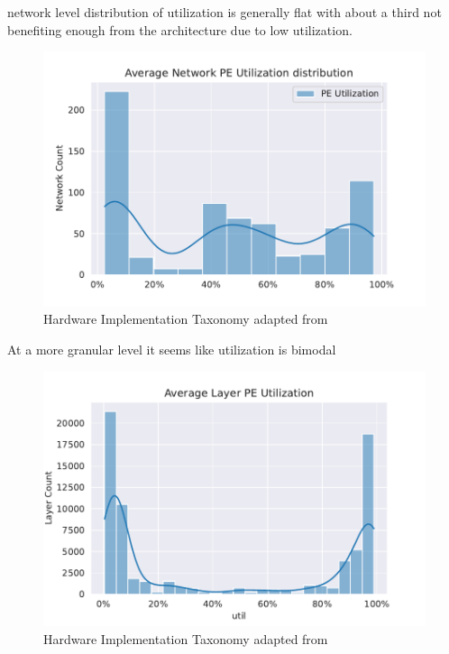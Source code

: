 network level distribution of utilization is generally flat with
about a third not benefiting enough from the architecture due to low
utilization. 


\begin{figure}[ht]
    \centering
    \includegraphics[scale=0.58]{Plots/utilization/network.pdf}
    \caption{Hardware Implementation Taxonomy adapted from \cite{maestro}}
    \label{fig:hw_taxonomy}
\end{figure}


At a more granular level it seems like utilization is bimodal

\begin{figure}[ht]
    \centering
    \includegraphics[scale=0.58]{Plots/utilization/layers.pdf}
    \caption{Hardware Implementation Taxonomy adapted from \cite{maestro}}
    \label{fig:hw_taxonomy}
\end{figure}

